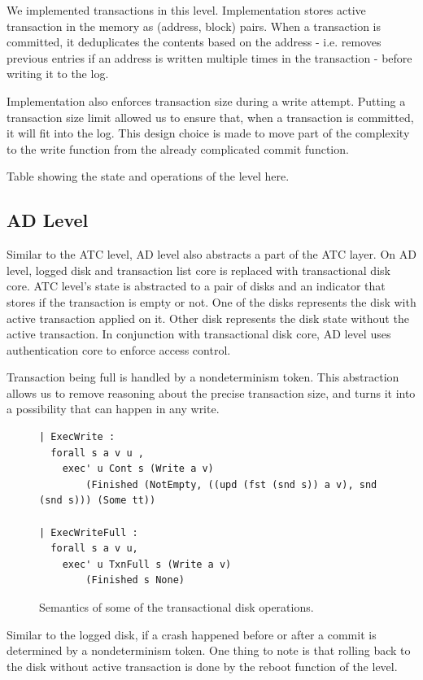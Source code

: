 We implemented transactions in this level. Implementation stores active transaction in the memory as (address, block) pairs. When a transaction is committed, it deduplicates the contents based on the address - i.e. removes previous entries if an address is written multiple times in the transaction - before writing it to the log.

Implementation also enforces transaction size during a write attempt. Putting a transaction size limit allowed us to ensure that, when a transaction is committed, it will fit into the log. This design choice is made to move part of the complexity to the write function from the already complicated commit function.

{\color{red} Table showing the state and operations of the level here}.

\subsection{AD Level}
Similar to the ATC level, AD level also abstracts a part of the ATC layer. On AD level, logged disk and transaction list core is replaced with transactional disk core. ATC level's state is abstracted to a pair of disks and an indicator that stores if the transaction is empty or not. One of the disks represents the disk with active transaction applied on it. Other disk represents the disk state without the active transaction. In conjunction with transactional disk core, AD level uses authentication core to enforce access control.

Transaction being full is handled by a nondeterminism token. This abstraction allows us to remove reasoning about the precise transaction size, and turns it into a possibility that can happen in any write.

\begin{figure}[H]
    \centering
\begin{verbatim}
| ExecWrite :
  forall s a v u ,
    exec' u Cont s (Write a v) 
        (Finished (NotEmpty, ((upd (fst (snd s)) a v), snd (snd s))) (Some tt))

| ExecWriteFull :
  forall s a v u,
    exec' u TxnFull s (Write a v) 
        (Finished s None)
\end{verbatim}
    \caption{Semantics of some of the transactional disk operations.}
    \label{fig:TD_Semantics}
\end{figure}

Similar to the logged disk, if a crash happened before or after a commit is determined by a nondeterminism token. One thing to note is that rolling back to the disk without active transaction is done by the reboot function of the level.

